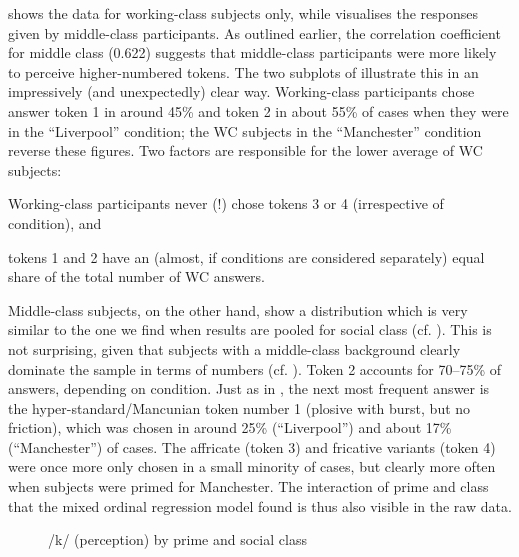  shows the data for working-class subjects only, while  visualises the responses given by middle-class participants.
As outlined earlier, the correlation coefficient 
for middle class (0.622) suggests that middle-class participants were more likely to perceive higher-numbered tokens.
The two subplots of  illustrate this in an impressively (and unexpectedly) clear way.
Working-class participants chose answer token 1 in around 45\% and token 2 in about 55\% of cases when they were in the ``Liverpool'' condition; the WC subjects in the ``Manchester'' condition reverse these figures.
Two factors are responsible for the lower average of WC subjects:
\begin{inparaenum}[(a)]
	\item Working-class participants never (!) chose tokens 3 or 4 (irrespective of  condition), and
	\item tokens 1 and 2 have an (almost, if conditions are considered separately) equal share of the total number of WC answers.
\end{inparaenum} 

Middle-class subjects, on the other hand, show a distribution which is very similar to the one we find when results are pooled for social class (cf. ).
This is not surprising, given that subjects with a middle-class background clearly dominate the sample in terms of numbers (cf. ).
Token 2 accounts for 70--75\% of answers, depending on  condition.
Just as in , the next most frequent answer is the hyper-standard/Mancunian token number 1 (plosive with burst, but no friction), which was chosen in around 25\% (``Liverpool'') and about 17\% (``Manchester'') of cases.
The affricate (token 3) and fricative variants (token 4) were once more only chosen in a small minority of cases, but clearly more often when subjects were primed for Manchester.
The interaction of prime and class that the mixed ordinal regression model found is thus also visible in the raw data.

\begin{figure}
	
		\resizebox{.49\linewidth}{!}{} 
	\caption{/k/ (perception) by prime and social class}
	\label{fig.scatter.k.ext.classprime}
\end{figure}

